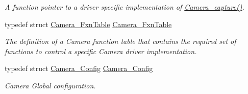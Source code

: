 \begin{DoxyCompactItemize}
\begin{DoxyCompactList}\small\item\em A function pointer to a driver specific implementation of \hyperlink{_camera_8h_a972bd90e219313d8eca55626c4294c8e}{Camera\+\_\+capture()}. \end{DoxyCompactList}\item 
typedef struct \hyperlink{struct_camera___fxn_table}{Camera\+\_\+\+Fxn\+Table} \hyperlink{_camera_8h_a8c1bd8d1a6d98633dc28a657733d56c8}{Camera\+\_\+\+Fxn\+Table}
\begin{DoxyCompactList}\small\item\em The definition of a Camera function table that contains the required set of functions to control a specific Camera driver implementation. \end{DoxyCompactList}\item 
typedef struct \hyperlink{struct_camera___config}{Camera\+\_\+\+Config} \hyperlink{_camera_8h_a5dc443a0790d8bd9762dff8cc0716ca0}{Camera\+\_\+\+Config}
\begin{DoxyCompactList}\small\item\em Camera Global configuration. \end{DoxyCompactList}\end{DoxyCompactItemize}
